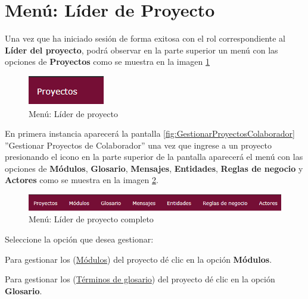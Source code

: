 \section{Menú: Líder de Proyecto}

	Una vez que ha iniciado sesión de forma exitosa con el rol correspondiente al \textbf{Líder del proyecto}, podrá observar en la parte superior un menú con las opciones de \textbf{Proyectos} como se muestra en la imagen \ref{fig:MN-LP}

		\begin{figure}[htbp!]
			\begin{center}
				\includegraphics[scale=1]{roles/lider/menu/pantallas/MN-LP}
				\caption{Menú: Líder de proyecto}
				\label{fig:MN-LP}
			\end{center}
		\end{figure}
	
	En primera instancia aparecerá la pantalla \ref{fig:GestionarProyectosColaborador} ''Gestionar Proyectos de Colaborador'' una vez que ingrese a un proyecto presionando el icono \IUingresar en la parte superior de la pantalla aparecerá el menú con las opciones de \textbf{Módulos}, \textbf{Glosario}, \textbf{Mensajes}, \textbf{Entidades}, \textbf{Reglas de negocio} y \textbf{Actores} como se muestra en la imagen \ref{fig:MN-LPC}.
	
	\begin{figure}[htbp!]
		\begin{center}
			\includegraphics[scale=0.8]{roles/lider/menu/pantallas/MN-LPC}
			\caption{Menú: Líder de proyecto completo}
			\label{fig:MN-LPC}
		\end{center}
	\end{figure}
	
	 Seleccione la opción que desea gestionar:
	
	Para gestionar los (\hyperlink{cv:GestionarModulos}{Módulos}) del proyecto dé clic en la opción \textbf{Módulos}.
	
	Para gestionar los (\hyperlink{cv:GestionarGlosario}{Términos de glosario}) del proyecto dé clic en la opción \textbf{Glosario}.
	
